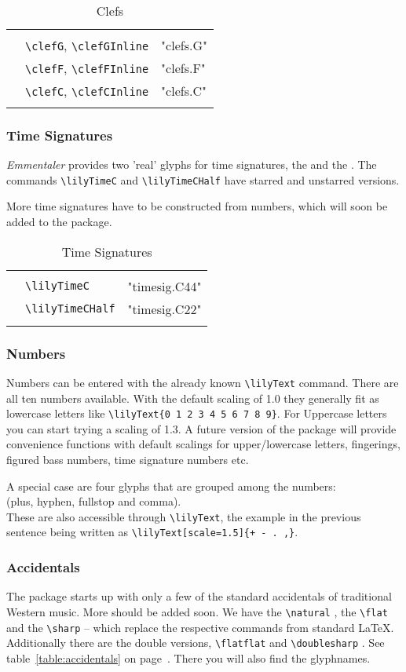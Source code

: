 \documentclass{article}
\newcommand*{\cmd}[1]{\texttt{\textbackslash #1}}
\newcommand{\tmpCaption}{} %
\newcommand{\tmpLabel}{}
\newenvironment{reftable}[2]
	{%
		\renewcommand{\tmpCaption}{#1}
		\renewcommand{\tmpLabel}{#2}
		\begin{table}[ht]
		\begin{center}
		\begin{tabular}[t]{lll}
		\hline
		&\\
	}
	{%
		&\\
		\hline
		\end{tabular}
		\caption{\tmpCaption}
		\label{table:\tmpLabel}
		\end{center}
		\end{table}
	}
\begin{document}
\begin{reftable}{Clefs}{clefs}
\clefGInline & \cmd{clefG}, \cmd{clefGInline} & "clefs.G"\\
\clefFInline & \cmd{clefF}, \cmd{clefFInline} & "clefs.F"\\
\clefCInline & \cmd{clefC}, \cmd{clefCInline} & "clefs.C"\\
\end{reftable}

\subsubsection{Time Signatures}
\emph{Emmentaler} provides two 'real' glyphs for time signatures, the \lilyTimeC* and the \lilyTimeCHalf.
The commands \cmd{lilyTimeC} and \cmd{lilyTimeCHalf} have starred and unstarred versions. 

More time signatures have to be constructed from numbers, which will soon be added to the package.

\begin{reftable}{Time Signatures}{timesignatures}
\lilyTimeC & \cmd{lilyTimeC} & "timesig.C44"\\
\lilyTimeCHalf & \cmd{lilyTimeCHalf} & "timesig.C22"\\
\end{reftable}


\subsubsection{Numbers}
Numbers can be entered with the already known \cmd{lilyText} command. 
There are all ten numbers available. 
With the default scaling of 1.0 they generally fit as lowercase letters like  \cmd{lilyText\{0 1 2 3 4 5 6 7 8 9\}}. 
For Uppercase letters you can start trying a scaling of 1.3. A future version of the package will provide convenience functions with default scalings for upper/lowercase letters, fingerings, figured bass numbers, time signature numbers etc.

A special case are four glyphs that are grouped among the numbers:\\
 (plus, hyphen, fullstop and comma). \\
These are also accessible through \cmd{lilyText}, the example in the previous sentence being written as \cmd{lilyText[scale=1.5]\{+~-~.~,\}}.

\subsubsection{Accidentals}
The package starts up with only a few of the standard accidentals of traditional Western music. 
More should be added soon. 
We have the \cmd{natural} \natural, the \cmd{flat} \flat* and the \cmd{sharp} \sharp* -- which replace the respective commands from standard \LaTeX. 
Additionally there are the double versions, \cmd{flatflat} \flatflat* and \cmd{doublesharp} \doublesharp. See table~\ref{table:accidentals} on page~\pageref{table:accidentals}. 
There you will also find the glyphnames.
\end{document}
